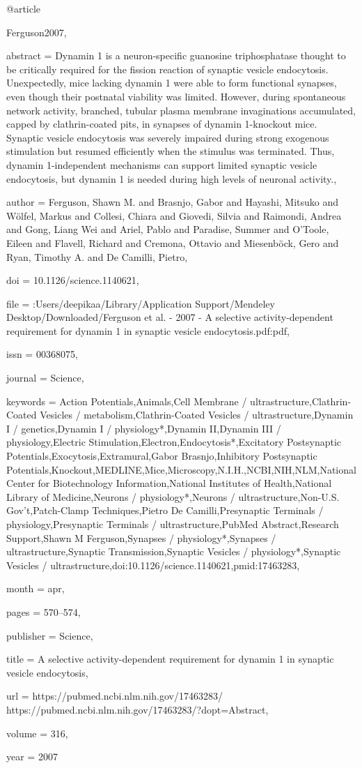 @article{Ferguson2007,

abstract = {Dynamin 1 is a neuron-specific guanosine triphosphatase thought to be critically required for the fission reaction of synaptic vesicle endocytosis. Unexpectedly, mice lacking dynamin 1 were able to form functional synapses, even though their postnatal viability was limited. However, during spontaneous network activity, branched, tubular plasma membrane invaginations accumulated, capped by clathrin-coated pits, in synapses of dynamin 1-knockout mice. Synaptic vesicle endocytosis was severely impaired during strong exogenous stimulation but resumed efficiently when the stimulus was terminated. Thus, dynamin 1-independent mechanisms can support limited synaptic vesicle endocytosis, but dynamin 1 is needed during high levels of neuronal activity.},

author = {Ferguson, Shawn M. and Brasnjo, Gabor and Hayashi, Mitsuko and W{\"{o}}lfel, Markus and Collesi, Chiara and Giovedi, Silvia and Raimondi, Andrea and Gong, Liang Wei and Ariel, Pablo and Paradise, Summer and O'Toole, Eileen and Flavell, Richard and Cremona, Ottavio and Miesenb{\"{o}}ck, Gero and Ryan, Timothy A. and {De Camilli}, Pietro},

doi = {10.1126/science.1140621},

file = {:Users/deepikaa/Library/Application Support/Mendeley Desktop/Downloaded/Ferguson et al. - 2007 - A selective activity-dependent requirement for dynamin 1 in synaptic vesicle endocytosis.pdf:pdf},

issn = {00368075},

journal = {Science},

keywords = {Action Potentials,Animals,Cell Membrane / ultrastructure,Clathrin-Coated Vesicles / metabolism,Clathrin-Coated Vesicles / ultrastructure,Dynamin I / genetics,Dynamin I / physiology*,Dynamin II,Dynamin III / physiology,Electric Stimulation,Electron,Endocytosis*,Excitatory Postsynaptic Potentials,Exocytosis,Extramural,Gabor Brasnjo,Inhibitory Postsynaptic Potentials,Knockout,MEDLINE,Mice,Microscopy,N.I.H.,NCBI,NIH,NLM,National Center for Biotechnology Information,National Institutes of Health,National Library of Medicine,Neurons / physiology*,Neurons / ultrastructure,Non-U.S. Gov't,Patch-Clamp Techniques,Pietro De Camilli,Presynaptic Terminals / physiology,Presynaptic Terminals / ultrastructure,PubMed Abstract,Research Support,Shawn M Ferguson,Synapses / physiology*,Synapses / ultrastructure,Synaptic Transmission,Synaptic Vesicles / physiology*,Synaptic Vesicles / ultrastructure,doi:10.1126/science.1140621,pmid:17463283},

month = {apr},

pages = {570--574},

publisher = {Science},

title = {{A selective activity-dependent requirement for dynamin 1 in synaptic vesicle endocytosis}},

url = {https://pubmed.ncbi.nlm.nih.gov/17463283/ https://pubmed.ncbi.nlm.nih.gov/17463283/?dopt=Abstract},

volume = {316},

year = {2007}

}

